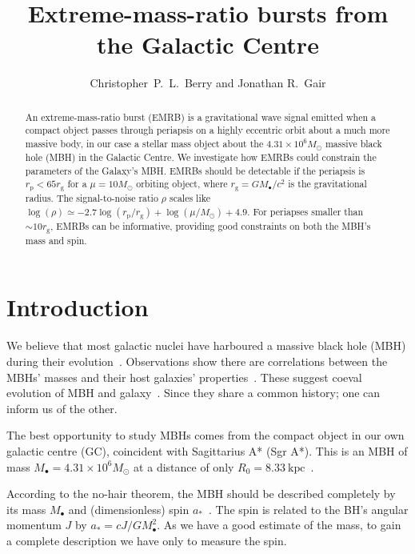 \documentclass[11pt,twoside]{article}
\begin{document}
\resetcounters

\title{Extreme-mass-ratio bursts from the Galactic Centre}
 \author{Christopher~P.~L.~Berry and Jonathan R.\ Gair }
 
\begin{abstract} 
An extreme-mass-ratio burst (EMRB) is a gravitational wave signal emitted when a compact object passes through periapsis on a highly eccentric orbit about a much more massive body, in our case a stellar mass object about the $4.31 \times 10^6 M_\odot$ massive black hole (MBH) in the Galactic Centre. We investigate how EMRBs could constrain the parameters of the Galaxy's MBH. EMRBs should be detectable if the periapsis is $r_\mathrm{p} < 65 r_\mathrm{g}$ for a $\mu = 10 M_\odot$ orbiting object, where $r_\mathrm{g} = GM_\bullet/c^2$ is the gravitational radius. The signal-to-noise ratio $\rho$ scales like $\log(\rho) \simeq -2.7\log(r_\mathrm{p}/r_\mathrm{g}) + \log(\mu/M_\odot) + 4.9$. For periapses smaller than $\sim 10 r_\mathrm{g}$, EMRBs can be informative, providing good constraints on both the MBH's mass and spin.
\end{abstract}

\section{Introduction} 

We believe that most galactic nuclei have harboured a massive black hole (MBH) during their evolution~\citep{Lynden-Bell1971, Rees1984}. Observations show there are correlations between the MBHs' masses and their host galaxies' properties~\citep{Kormendy1995, Magorrian1998, Graham2011}. These suggest coeval evolution of MBH and galaxy~\citep{Peng2007, Jahnke2011}. Since they share a common history; one can inform us of the other.

The best opportunity to study MBHs comes from the compact object in our own galactic centre (GC), coincident with Sagittarius A* (Sgr A*). This is an MBH of mass $M_\bullet = 4.31 \times 10^6 M_\odot$ at a distance of only $R_0 = 8.33~\mathrm{kpc}$~\citep{Gillessen2009}.

According to the no-hair theorem, the MBH should be described completely by its mass $M_\bullet$ and (dimensionless) spin $a_\ast$~\citep{Chandrasekhar1998}. The spin is related to the BH's angular momentum $J$ by $a_\ast = cJ/GM_\bullet^2$. As we have a good estimate of the mass, to gain a complete description we have only to measure the spin.
\end{document}
